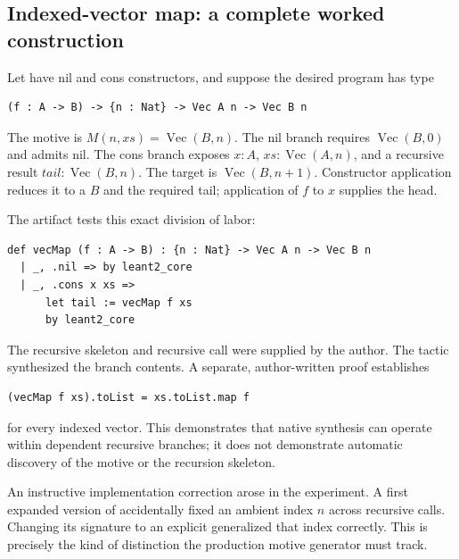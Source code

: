 \subsection{Indexed-vector map: a complete worked construction}

Let  have nil and cons constructors, and suppose the desired program has type
\par\noindent\begin{minipage}{\linewidth}
\begin{lstlisting}
(f : A -> B) -> {n : Nat} -> Vec A n -> Vec B n
\end{lstlisting}
\end{minipage}\par
The motive is $M(n,xs)=\operatorname{Vec}(B,n)$. The nil branch requires $\operatorname{Vec}(B,0)$ and admits nil. The cons branch exposes $x:A$, $xs:\operatorname{Vec}(A,n)$, and a recursive result $tail:\operatorname{Vec}(B,n)$. The target is $\operatorname{Vec}(B,n+1)$. Constructor application reduces it to a $B$ and the required tail; application of $f$ to $x$ supplies the head.

The artifact tests this exact division of labor:
\par\noindent\begin{minipage}{\linewidth}
\begin{lstlisting}
def vecMap (f : A -> B) : {n : Nat} -> Vec A n -> Vec B n
  | _, .nil => by leant2_core
  | _, .cons x xs =>
      let tail := vecMap f xs
      by leant2_core
\end{lstlisting}
\end{minipage}\par
The recursive skeleton and recursive call were supplied by the author. The tactic synthesized the branch contents. A separate, author-written proof establishes
\par\noindent\begin{minipage}{\linewidth}
\begin{lstlisting}
(vecMap f xs).toList = xs.toList.map f
\end{lstlisting}
\end{minipage}\par
for every indexed vector. This demonstrates that native synthesis can operate within dependent recursive branches; it does not demonstrate automatic discovery of the motive or the recursion skeleton.

An instructive implementation correction arose in the experiment. A first expanded version of  accidentally fixed an ambient index $n$ across recursive calls. Changing its signature to an explicit  generalized that index correctly. This is precisely the kind of distinction the production motive generator must track.

